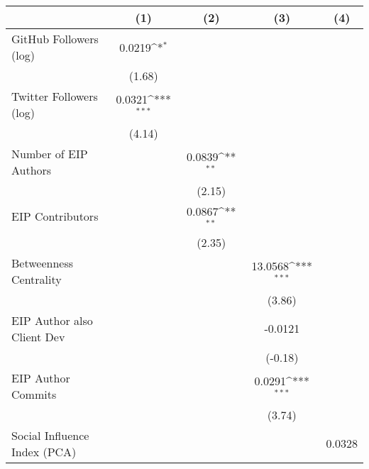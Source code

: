 {
\def\sym#1{\ifmmode^{#1}\else\(^{#1}\)\fi}
\begin{tabular}{l*{4}{c}}
\hline\hline
                                   &\multicolumn{1}{c}{(1)}         &\multicolumn{1}{c}{(2)}         &\multicolumn{1}{c}{(3)}         &\multicolumn{1}{c}{(4)}         \\
\hline
GitHub Followers (log)             &    0.0219\sym{*}  &                   &                   &                   \\
                                   &    (1.68)         &                   &                   &                   \\
[1em]
Twitter Followers (log)            &    0.0321\sym{***}&                   &                   &                   \\
                                   &    (4.14)         &                   &                   &                   \\
[1em]
Number of EIP Authors              &                   &    0.0839\sym{**} &                   &                   \\
                                   &                   &    (2.15)         &                   &                   \\
[1em]
EIP Contributors                   &                   &    0.0867\sym{**} &                   &                   \\
                                   &                   &    (2.35)         &                   &                   \\
[1em]
Betweenness Centrality             &                   &                   &   13.0568\sym{***}&                   \\
                                   &                   &                   &    (3.86)         &                   \\
[1em]
EIP Author also Client Dev         &                   &                   &   -0.0121         &                   \\
                                   &                   &                   &   (-0.18)         &                   \\
[1em]
EIP Author Commits                 &                   &                   &    0.0291\sym{***}&                   \\
                                   &                   &                   &    (3.74)         &                   \\
[1em]
Social Influence Index (PCA)       &                   &                   &                   &    0.0328         \\

\end{tabular}}
